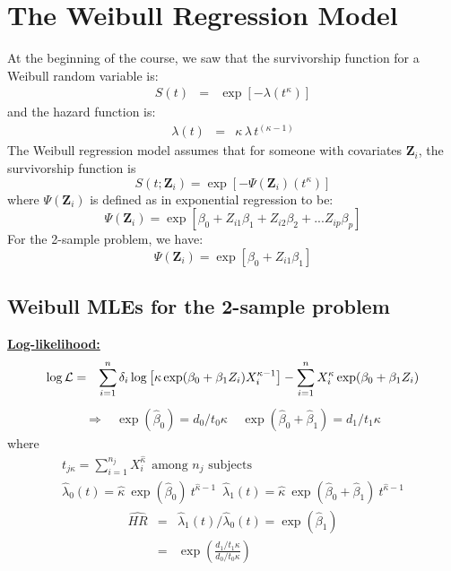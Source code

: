\documentclass[11pt,psfig]{book}
\newcommand{\bfZ}{\mathbf{Z}}
\begin{document}
\section{The Weibull Regression Model}
At the beginning of the course, we saw that the survivorship function
for a Weibull random variable is:
\begin{eqnarray*}
 S(t) & = & \exp[- \lambda ( t^\kappa) ]
\end{eqnarray*}
and the hazard function is:
\begin{eqnarray*}
 \lambda(t) & = & \kappa \, \lambda \, t^{(\kappa-1)}
\end{eqnarray*}
The Weibull regression model assumes that for someone with
covariates ${\bfZ_i}$, the survivorship function is
\[  S(t; {\bfZ_i} ) = \exp[- \Psi(\bfZ_i)  ( t^\kappa) ] \]
where $\Psi(\bfZ_i)$ is defined as in exponential regression to be:
\[  \Psi(\bfZ_i)  = \exp[ \beta_0 +
      Z_{i1}  \beta_1 +  Z_{i2}  \beta_2  + ... Z_{ip}
    \beta_p] \]
For the 2-sample problem, we have:
\[  \Psi(\bfZ_i)  = \exp[ \beta_0 + Z_{i1}  \beta_1] \]
\subsection{Weibull MLEs for the 2-sample problem}
\underline{\bf Log-likelihood:}
\begin{eqnarray*}
\log {\cal L} & = &  \sum_{i=1}^{n} {\delta_i}
\log\left[\kappa \exp(\beta_0 + \beta_1 Z_i) X_i^{\kappa-1}\right] -
\sum_{i=1}^{n} X_i^{\kappa} \exp(\beta_0 +\beta_1 Z_i)
\end{eqnarray*}
\begin{eqnarray*}
\Rightarrow ~~~~ \exp(\hat\beta_0)  =  d_0/t_{0}\kappa ~~~~~
\exp(\hat\beta_0 + \hat\beta_1) = d_1/t_{1}\kappa
\end{eqnarray*}
where
\begin{eqnarray*}
t_{j\kappa}  =  \sum_{i=1}^{n_j} X_i^{\hat\kappa}
~~\mbox{among $n_j$ subjects}\\
\hat\lambda_0(t) = \hat\kappa ~\exp(\hat\beta_0) ~t^{\hat\kappa-1} \,\,\,
\hat\lambda_1(t) = \hat\kappa ~\exp(\hat\beta_0+\hat\beta_1)
~t^{\hat\kappa-1}
\end{eqnarray*}
\begin{eqnarray*}
     \widehat{HR} & = & \hat\lambda_1(t)/\hat\lambda_0(t)
= \exp(\hat\beta_1) \\
                  & = & \exp\left(\frac{d_1/t_{1}\kappa}
                       {d_0/t_{0}\kappa}\right)
\end{eqnarray*}
\end{document}
